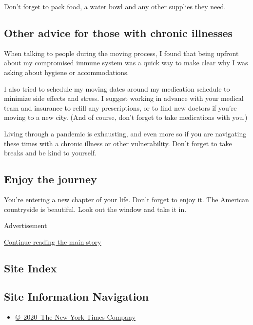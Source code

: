 Don't forget to pack food, a water bowl and any other supplies they
need.

\hypertarget{other-advice-for-those-with-chronic-illnesses}{%
\subsection{Other advice for those with chronic
illnesses}\label{other-advice-for-those-with-chronic-illnesses}}

When talking to people during the moving process, I found that being
upfront about my compromised immune system was a quick way to make clear
why I was asking about hygiene or accommodations.

I also tried to schedule my moving dates around my medication schedule
to minimize side effects and stress. I suggest working in advance with
your medical team and insurance to refill any prescriptions, or to find
new doctors if you're moving to a new city. (And of course, don't forget
to take medications with you.)

Living through a pandemic is exhausting, and even more so if you are
navigating these times with a chronic illness or other vulnerability.
Don't forget to take breaks and be kind to yourself.

\hypertarget{enjoy-the-journey}{%
\subsection{Enjoy the journey}\label{enjoy-the-journey}}

You're entering a new chapter of your life. Don't forget to enjoy it.
The American countryside is beautiful. Look out the window and take it
in.

Advertisement

\protect\hyperlink{after-bottom}{Continue reading the main story}

\hypertarget{site-index}{%
\subsection{Site Index}\label{site-index}}

\hypertarget{site-information-navigation}{%
\subsection{Site Information
Navigation}\label{site-information-navigation}}

\begin{itemize}
\tightlist
\item
  \href{https://help.nytimes.com/hc/en-us/articles/115014792127-Copyright-notice}{©~2020~The
  New York Times Company}
\end{itemize}

